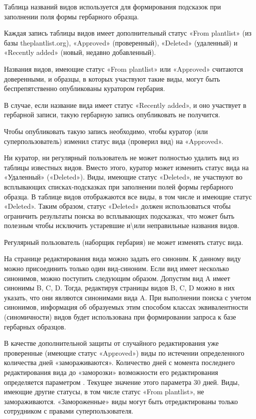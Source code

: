\documentclass[letterpaper,10pt,russian]{sphinxmanual}
\begin{document}
Таблица названий видов используется для формирования подсказок
при заполнении поля  формы гербарного образца.

Каждая запись таблицы видов имеет дополнительный статус \textendash{}
«From plantlist» (из базы theplantlist.org),
«Approved» (проверенный), «Deleted» (удаленный) и  «Recently added»
(новый, недавно добавленный).

Названия видов, имеющие статус «From plantlist» или «Approved»
считаются доверенными, и образцы, в которых участвуют такие виды,
могут быть беспрепятственно опубликованы куратором гербария.

В случае, если название вида имеет статус «Recently added», и оно
участвует в гербарной записи, такую гербарную запись опубликовать не получится.

Чтобы опубликовать такую запись необходимо, чтобы куратор
(или суперпользователь) изменил статус вида (проверил вид) на «Approved».

Ни куратор, ни регулярный пользователь не может полностью удалить вид
из таблицы известных видов. Вместо этого, куратор может изменить
статус вида на «Удаленный» («Deleted»).
Виды, имеющие статус «Deleted», не участвуют во всплывающих списках-подсказках
при заполнении полей формы гербарного образца. В таблице видов отображаются все виды,
в том числе и имеющие статус «Deleted».
Таким образом, статус «Deleted» должен использоваться чтобы ограничить результаты
поиска во всплывающих подсказках, что может быть полезным чтобы исключить
устаревшие и\textbackslash{}или неправильные названия видов.

Регулярный пользователь (наборщик гербария) не может изменять статус вида.

На странице редактирования вида можно задать его синоним. К данному виду
можно присоединить только один вид-синоним.
Если вид имеет несколько синонимов, можно поступить следующим образом.
Допустим вид A имеет синонимы B, C, D.
Тогда, редактируя страницы видов B, C, D можно в них указать, что
они являются синонимами вида A. При выполнении поиска с учетом синонимов,
информация об образуемых этим способом классах эквивалентности (синомичности)
видов будет использована при формировании запроса к базе гербарных образцов.

В качестве дополнительной защиты от случайного редактирования
уже проверенные (имеющие статус «Approved»)
виды по истечении определенного количества дней «замораживаются».
Количество дней с момента последнего
редактирования вида до «заморозки» возможности его
редактирования определяется параметром
. Текущее значение этого параметра 30 дней.
Виды, имеющие другие статусы, в том числе статус «From plantlist»,
не замораживаются. «Замороженные» виды могут быть отредактированы
только сотрудником с правами суперпользователя.
\end{document}
